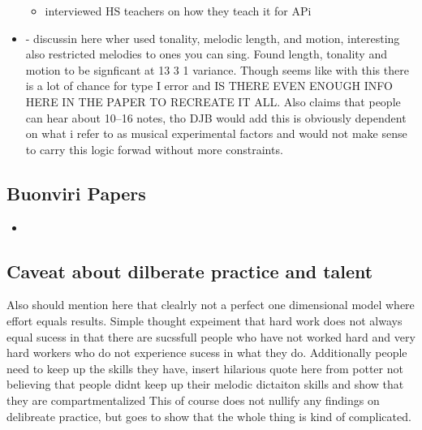 \documentclass[]{book}
\providecommand{\tightlist}{%
  \setlength{\itemsep}{0pt}\setlength{\parskip}{0pt}}
\theoremstyle{definition}
\theoremstyle{definition}
\theoremstyle{definition}
\theoremstyle{remark}
\begin{document}
\begin{itemize}
  \begin{itemize}
  \tightlist
  \item
    \citep{paneyTeachingMelodicDictation2014} interviewed HS teachers on
    how they teach it for APi
  \end{itemize}
\item
  \citep{pembrookInterferenceTranscriptionProcess1986} - discussin here
  wher used tonality, melodic length, and motion, interesting also
  restricted melodies to ones you can sing. Found length, tonality and
  motion to be signficant at 13 3 1 variance. Though seems like with
  this there is a lot of chance for type I error and IS THERE EVEN
  ENOUGH INFO HERE IN THE PAPER TO RECREATE IT ALL. Also claims that
  people can hear about 10--16 notes, tho DJB would add this is
  obviously dependent on what i refer to as musical experimental factors
  and would not make sense to carry this logic forwad without more
  constraints.
\end{itemize}

\hypertarget{buonviri-papers}{%
\subsection{Buonviri Papers}\label{buonviri-papers}}

\begin{itemize}
\tightlist
\item
  \citep{buonviriEffectsMusicNotation2015, buonviriEffectsPreparatorySinging2015, buonviriEffectsTwoListening2017, buonviriExplorationUndergraduateMusic2014, buonviriMelodicDictationInstruction2015, paneyTeachingMelodicDictation2014}
\end{itemize}

\hypertarget{caveat-about-dilberate-practice-and-talent}{%
\subsection{Caveat about dilberate practice and
talent}\label{caveat-about-dilberate-practice-and-talent}}

Also should mention here that clealrly not a perfect one dimensional
model where effort equals results. Simple thought expeiment that hard
work does not always equal sucess in that there are sucssfull people who
have not worked hard and very hard workers who do not experience sucess
in what they do. Additionally people need to keep up the skills they
have, insert hilarious quote here from potter not believing that people
didnt keep up their melodic dictaiton skills and show that they are
compartmentalized \citep{potterIdentifyingSucessfulDictation1990} This
of course does not nullify any findings on delibreate practice, but goes
to show that the whole thing is kind of complicated.
\end{document}
